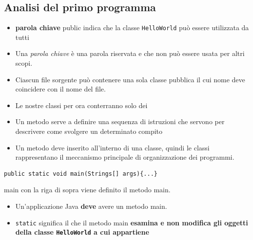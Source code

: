 \subsection*{Analisi del primo programma}
\begin{frame}
\begin{block}{}
\begin{itemize}
\item \textbf{parola chiave} \alert{public} indica che la classe \texttt{HelloWorld} può essere utilizzata da tutti
\item Una \textit{parola chiave} è una parola riservata e che non può essere usata per altri scopi.
\item Ciascun file sorgente può contenere una sola classe pubblica il cui nome deve coincidere con il nome del file.
\end{itemize}
\end{block}

\begin{block}{}
\begin{itemize}
\item Le nostre classi per ora conterranno solo dei 
\item Un metodo serve a definire una sequenza di istruzioni che servono per descrivere come svolgere un determinato
compito
\item Un metodo \alert{deve} inserito all'interno di una classe, quindi le classi rappresentano il meccanismo principale di organizzazione dei programmi.
\end{itemize}
\end{block}
\end{frame}

\begin{frame}[fragile]
\begin{lstlisting}
public static void main(Strings[] args){...}
\end{lstlisting}
\begin{block}{main}
con la riga di sopra viene definito il metodo \alert{main}.
\begin{itemize}
\item Un'applicazione Java \textbf{deve} avere un metodo \alert{main}.
\item \texttt{static} significa il che il metodo \alert{main} \textbf{esamina e non modifica gli oggetti 
della classe \texttt{HelloWorld} a cui appartiene}
\end{itemize}
\end{block}
\end{frame}

